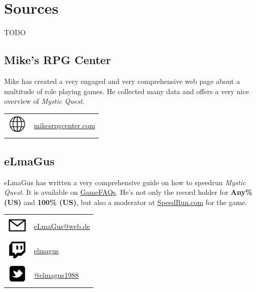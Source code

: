 \chapter{Sources}

TODO


\section{Mike's RPG Center}

Mike has created a very engaged and very comprehensive web page about a multitude of role playing games. He collected many data and offers a very nice overview of \textit{Mystic Quest}.

\begin{longtable}{ l p{9cm} }
	\includegraphics[height=1cm,keepaspectratio]{./resources/url}
	& \href{http://mikesrpgcenter.com/ffmq/index.html}{mikesrpgcenter.com}
\end{longtable}


\section{eLmaGus}

eLmaGus has written a very comprehensive guide on how to speedrun \textit{Mystic Quest}. It is available on
\href{https://gamefaqs.gamespot.com/snes/532476-final-fantasy-mystic-quest/faqs/68495}{GameFAQs}. 
He's not only the record holder for \textbf{Any\% (US)} and \textbf{100\% (US)}, but also a moderator at 
\href{https://www.speedrun.com/ffmq}{SpeedRun.com} for the game.

\begin{longtable}{ l p{9cm} }
	\includegraphics[height=1cm,keepaspectratio]{./resources/email}
	& \href{mailto:eLmaGus@web.de}{eLmaGus@web.de}
\\ %
	\includegraphics[height=1cm,keepaspectratio]{./resources/twitch}
	& \href{https://www.twitch.tv/elmagus}{elmagus}
\\ %
	\includegraphics[height=1cm,keepaspectratio]{./resources/twitter}
	& \href{https://twitter.com/elmagus1988}{@elmagus1988}
\end{longtable}
